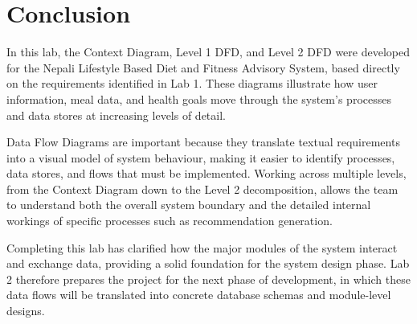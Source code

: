 \documentclass[12pt,a4paper]{report}
\begin{document}
\chapter{Conclusion}

In this lab, the Context Diagram, Level 1 DFD, and Level 2 DFD were developed for the Nepali
Lifestyle Based Diet and Fitness Advisory System, based directly on the requirements identified
in Lab 1. These diagrams illustrate how user information, meal data, and health goals move
through the system's processes and data stores at increasing levels of detail.

Data Flow Diagrams are important because they translate textual requirements into a visual model
of system behaviour, making it easier to identify processes, data stores, and flows that must be
implemented. Working across multiple levels, from the Context Diagram down to the Level 2
decomposition, allows the team to understand both the overall system boundary and the detailed
internal workings of specific processes such as recommendation generation.

Completing this lab has clarified how the major modules of the system interact and exchange
data, providing a solid foundation for the system design phase. Lab 2 therefore prepares the
project for the next phase of development, in which these data flows will be translated into
concrete database schemas and module-level designs.
\end{document}
